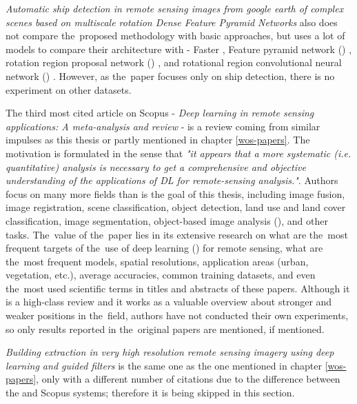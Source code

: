 \textit{Automatic ship detection in remote sensing images from google earth of complex scenes based on multiscale rotation Dense Feature Pyramid Networks} also does not compare the~proposed methodology with basic  approaches, but uses a lot of  models to compare their architecture with - Faster , Feature pyramid network () \cite{fpn}, rotation region proposal network () \cite{rrpn}, and rotational region convolutional neural network () \cite{r2cnn}. However, as the~paper focuses only on ship detection, there is no experiment on other datasets.

The third most cited article on Scopus - \textit{Deep learning in remote sensing applications: A meta-analysis and review} - is a review coming from similar impulses as this thesis or partly \cite{landslide-evaluation} mentioned in chapter \ref{wos-papers}. The motivation is formulated in the sense that \textit{"it appears that a more systematic (i.e. quantitative) analysis is necessary to get a comprehensive and objective understanding of the applications of DL for remote-sensing analysis."}. Authors focus on many more fields than is the goal of this thesis, including image fusion, image registration, scene classification, object detection, land use and land cover classification, image segmentation, object-based image analysis (), and other tasks. The~value of the~paper lies in its extensive research on what are the~most frequent targets of the~use of deep learning () for remote sensing, what are the~most frequent  models, spatial resolutions, application areas (urban, vegetation, etc.), average accuracies, common training datasets, and even the~most used scientific terms in titles and abstracts of these papers. Although it is a high-class review and it works as a valuable overview about  stronger and weaker positions in the~field, authors have not conducted their own experiments, so only results reported in the~original papers are mentioned, if mentioned.

\textit{Building extraction in very high resolution remote sensing imagery using deep learning and guided filters} is the same one as the one mentioned in chapter \ref{wos-papers}, only with a different number of citations due to the difference between the  and Scopus systems; therefore it is being skipped in this section.

